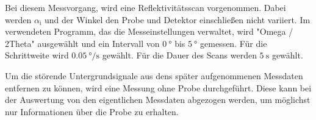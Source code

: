 Bei diesem Messvorgang, wird eine Reflektivitätsscan vorgenommen.
Dabei werden $\alpha_{\text{i}}$ und der Winkel den Probe und Detektor einschließen nicht
variiert. Im verwendeten Programm, das die Messeinstellungen verwaltet, wird
"Omega / 2Theta" ausgewählt und ein Intervall von $\SI{0}{\degree}$ bis
$\SI{5}{\degree}$ gemessen.
Für die Schrittweite wird $\SI{0.05}{\degree\per\second}$ 
gewählt. Für die Dauer des Scans werden $\SI{5}{\second}$ gewählt.


Um die störende Untergrundsignale aus dens später aufgenommenen Messdaten
entfernen zu können, wird eine Messung ohne Probe durchgeführt.
Diese kann bei der Auswertung von den eigentlichen Messdaten abgezogen werden,
um möglichst nur Informationen über die Probe zu erhalten.
